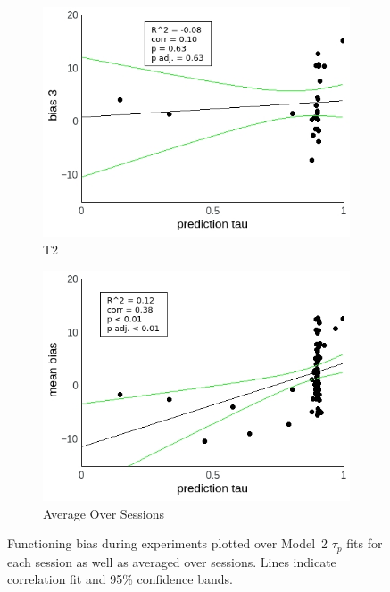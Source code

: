 \documentclass[a4paper]{scrreprt}
\begin{document}
\begin{figure}
\begin{subfigure}[b]{0.49\textwidth}
        \includegraphics[width=\textwidth]{figs/sec3/pred/pred_diff_3_mod2dat.jpeg}
        \caption{T2}
    \end{subfigure}
    \begin{subfigure}[b]{0.49\textwidth}
        \includegraphics[width=\textwidth]{figs/sec3/pred/pred_diff_mean_mod2dat.jpeg}
        \caption{Average Over Sessions}
    \end{subfigure}
\caption{Functioning bias during experiments plotted over Model~2 $\tau_p$ fits for each session as well as averaged over sessions. Lines indicate correlation fit and 95\% confidence bands.}
\label{fig:pred_diff_mod2dat}
\end{figure}
\end{document}

